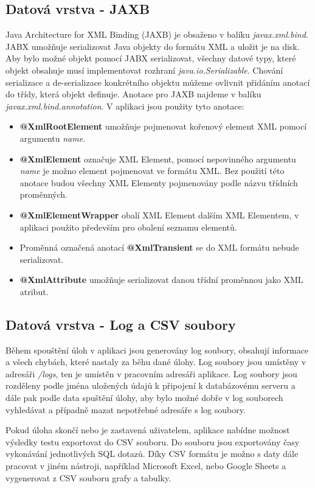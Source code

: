 \documentclass[czech,bachelor,public,dept460,male,cpdeclaration,twoside]{diploma}
\begin{document}
\subsection{Datová vrstva - JAXB} \label{jabx}
Java Architecture for XML Binding (JAXB) je obsaženo v balíku \textit{javax.xml.bind}. JABX umožňuje serializovat Java objekty do formátu XML a uložit je na disk. Aby bylo možné objekt pomocí JABX serializovat, všechny datové typy, které objekt obsahuje musí implementovat rozhraní \textit{java.io.Serializable}. Chování serializace a de-serializace konkrétního objektu můžeme ovlivnit přidáním anotací do třídy, která objekt definuje. Anotace pro JAXB najdeme v balíku \textit{javax.xml.bind.annotation}. V aplikaci jsou použity tyto anotace:
\begin{itemize}
  	\item \textbf{@XmlRootElement} umožňuje pojmenovat kořenový element XML pomocí argumentu \textit{name}.
  	\item \textbf{@XmlElement} označuje XML Element, pomocí nepovinného argumentu \textit{name} je možno element pojmenovat ve formátu XML. Bez použití této anotace budou všechny XML Elementy pojmenovány podle názvu třídních proměnných.
  	\item \textbf{@XmlElementWrapper} obalí XML Element dalším XML Elementem, v aplikaci použito především pro obalení seznamu elementů.
  	\item Proměnná označená anotací \textbf{@XmlTransient} se do XML formátu nebude serializovat.
  	\item \textbf{@XmlAttribute} umožňuje serializovat danou třídní proměnnou jako XML atribut.
\end{itemize}


\subsection{Datová vrstva - Log a CSV soubory} \label{logs}
\begin{minipage}{\linewidth}
Během spouštění úloh v aplikaci jsou generovány log soubory, obsahují informace a všech chybách, které nastaly za běhu dané úlohy. Log soubory jsou umístěny v adresáři \textit{/logs}, ten je umístěn v pracovním adresáři aplikace. Log soubory jsou rozděleny podle jména uložených údajů k připojení k databázovému serveru a dále pak podle data spuštění úlohy, aby bylo možné dobře v log souborech vyhledávat a případně mazat nepotřebné adresáře s log soubory.



Pokud úloha skončí nebo je zastavená uživatelem, aplikace nabídne možnost výsledky testu exportovat do CSV souboru. Do souboru jsou exportovány časy vykonávání jednotlivých SQL dotazů. Díky CSV formátu je možno s daty dále pracovat v jiném nástroji, například Microsoft Excel, nebo Google Sheets a vygenerovat z CSV souboru grafy a tabulky.
\end{minipage}
\end{document}
